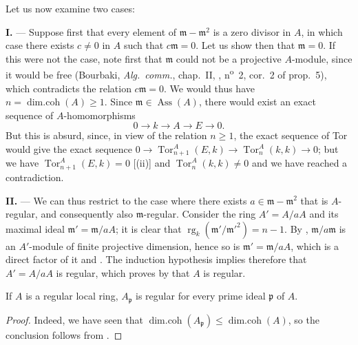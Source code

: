 Let us now examine two cases:

\medskip\noindent\textbf{I.} ---
Suppose first that every element of $\mathfrak{m}-\mathfrak{m}^2$ is a zero divisor in $A$, in which case  there exists $c\neq 0$ in $A$ such that $c\mathfrak{m}=0$.
Let us show then that $\mathfrak{m}=0$.
If this were not the case, note first that $\mathfrak{m}$ could not be a projective $A$-module, since it would be free (Bourbaki, \emph{Alg.~comm.}, chap.~II, , n\textsuperscript{o}~2, cor.~2 of prop.~5), which contradicts the relation $c\mathfrak{m}=0$.
We would thus have $n=\operatorname{dim.coh}(A)\geq 1$.
Since $\mathfrak{m}\in\operatorname{Ass}(A)$, there would exist an exact sequence of $A$-homomorphisms
\[
  0\to k\to A\to E\to 0.
\]
But this is absurd, since, in view of the relation $n\geq 1$, the exact sequence of Tor would give the exact sequence $0\to\operatorname{Tor}^A_{n+1}(E,k)\to\operatorname{Tor}^A_n(k,k)\to 0$;
but we have $\operatorname{Tor}^A_{n+1}(E,k)=0$ [(ii)] and $\operatorname{Tor}^A_n(k,k)\neq 0$  and we have reached a contradiction.

\medskip\noindent\textbf{II.} ---
We can thus restrict to the case where there exists $a\in\mathfrak{m}-\mathfrak{m}^2$ that is $A$-regular, and consequently also $\mathfrak{m}$-regular.
Consider the ring $A'=A/aA$ and its maximal ideal $\mathfrak{m}'=\mathfrak{m}/aA$;
it is clear that $\operatorname{rg}_k(\mathfrak{m}'/\mathfrak{m}'^2)=n-1$.
By , $\mathfrak{m}/a\mathfrak{m}$ is an $A'$-module of finite projective dimension, hence so is $\mathfrak{m}'=\mathfrak{m}/aA$, which is a direct factor of it  and .
The induction hypothesis implies therefore that $A'=A/aA$ is regular, which proves by  that $A$ is regular.

\begin{corollary}[17.3.2]
\label{0.17.3.2}
If $A$ is a regular local ring, $A_\mathfrak{p}$ is regular for every prime ideal $\mathfrak{p}$ of $A$.
\end{corollary}

\begin{proof}
Indeed, we have seen  that $\operatorname{dim.coh}(A_\mathfrak{p})\leq\operatorname{dim.coh}(A)$, so the conclusion follows from .
\end{proof}

